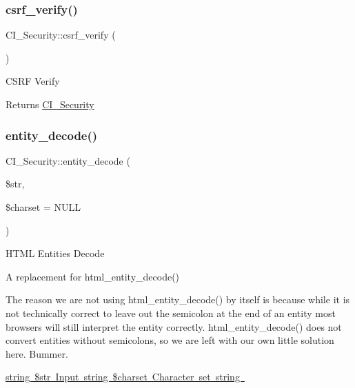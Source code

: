 \subsubsection{\texorpdfstring{csrf\+\_\+verify()}{csrf\_verify()}}
{\footnotesize\ttfamily C\+I\+\_\+\+Security\+::csrf\+\_\+verify (\begin{DoxyParamCaption}{ }\end{DoxyParamCaption})}

C\+S\+RF Verify

\begin{DoxyReturn}{Returns}
\mbox{\hyperlink{class_c_i___security}{C\+I\+\_\+\+Security}} 
\end{DoxyReturn}
\mbox{\label{class_c_i___security_af0bf4f5717d0834d9fecb00e37b78019}} 
\subsubsection{\texorpdfstring{entity\+\_\+decode()}{entity\_decode()}}
{\footnotesize\ttfamily C\+I\+\_\+\+Security\+::entity\+\_\+decode (\begin{DoxyParamCaption}\item[{}]{\$str,  }\item[{}]{\$charset = {\ttfamily NULL} }\end{DoxyParamCaption})}

H\+T\+ML Entities Decode

A replacement for html\+\_\+entity\+\_\+decode()

The reason we are not using html\+\_\+entity\+\_\+decode() by itself is because while it is not technically correct to leave out the semicolon at the end of an entity most browsers will still interpret the entity correctly. html\+\_\+entity\+\_\+decode() does not convert entities without semicolons, so we are left with our own little solution here. Bummer.

\mbox{\hyperlink{}{string \$str Input  string \$charset Character set  string }}\mbox{\label{class_c_i___security_a2477852d563549abd32f4b83b8f30034}} 
